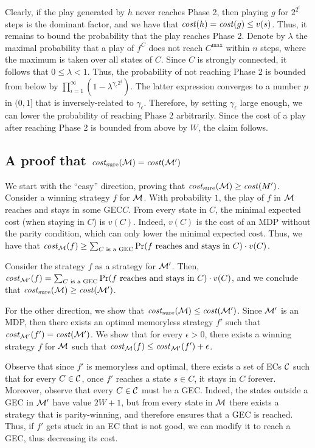 \documentclass[runningheads,a4paper]{llncs}
\newcommand{\C}{{\cal C}}
\newcommand{\M}{{\cal M}}
\newcommand{\cost}{{\it cost}}
\newcommand{\costs}{{\it cost}_{\rm sure}}
\newcommand{\gec}{{GEC}\xspace}
\begin{document}
Clearly, if the play generated by $h$ never reaches Phase 2, then playing $g$ for $2^{2^i}$ steps is the dominant factor, and we have that $\cost(h)=\cost(g)\le v(s)$. Thus, it remains to bound the probability that the play reaches Phase 2. 
Denote by $\lambda$ the maximal probability that a play of $f^C$ does not reach $C^{\max}$ within $n$ steps, where the maximum is taken over all states of $C$. Since $C$ is strongly connected, it follows that $0\le \lambda<1$. Thus, the probability of not reaching Phase 2 is bounded from below by $\prod_{i=1}^\infty (1-\lambda^{\gamma_\epsilon 2^i})$. The latter expression converges to a number $p$ in $(0,1]$ that is 
inversely-related to $\gamma_\epsilon$. Therefore, by setting $\gamma_\epsilon$ large enough, we can lower the probability of reaching Phase 2 arbitrarily. Since the cost of a play after reaching Phase 2 is bounded from above by $W$, the claim follows.


\subsection{A proof that $\costs(\M)=\cost(\M') $}

We start with the ``easy'' direction, proving that $\costs(\M)\ge \cost(M')$. Consider a winning strategy $f$ for $\M$. With probability $1$, the play of $f$ in $\M$ reaches and stays in some \gec $C$. From every state in $C$, the minimal expected cost (when staying in $C$) is $v(C)$. Indeed, $v(C)$ is the cost of an MDP without the parity condition, which can only lower the minimal expected cost.
 Thus, we have that $\cost_\M(f)\ge \sum_{C\text{ is a \gec}}\Pr(f \text{ reaches and stays in }C)\cdot v(C)$.

Consider the strategy $f$ as a strategy for $\M'$. Then, $\cost_{\M'}(f)=\sum_{C\text{ is a \gec}}\Pr(f \text{ reaches and stays in }C)\cdot v(C)$, and we conclude that $\costs(\M)\ge \cost(\M')$.

For the other direction, we show that $\costs(\M)\le \cost(\M')$. Since $\M'$ is an MDP, then there exists an optimal memoryless strategy $f'$ such that $\cost_{\M'}(f')=\cost(\M')$. We show that for every $\epsilon>0$, there exists a winning strategy $f$ for $\M$ such that $\cost_{\M}(f)\le \cost_{\M'}(f')+\epsilon$. 

Observe that since $f'$ is memoryless and optimal, there exists a set of ECs ${\C}$  such that for every $C\in \C$, once $f'$ reaches a state $s\in C$, it stays in $C$ forever. Moreover, observe that every $C\in \C$ must be a \gec. Indeed, the states outside a \gec in $\M'$ have value $2W+1$, but from every state in $\M$ there exists a strategy that is parity-winning, and therefore ensures that a \gec is reached. Thus, if $f'$ gets stuck in an EC that is not good, we can modify it to reach a \gec, thus decreasing its cost. 
\end{document}
